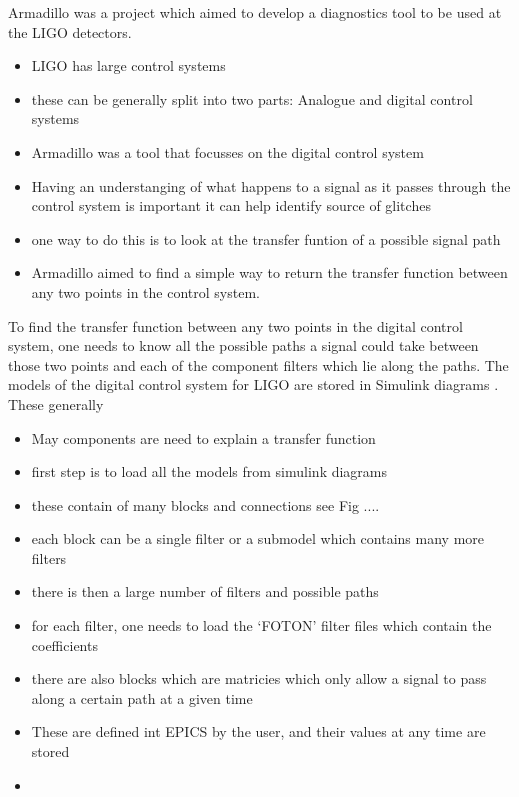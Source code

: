 Armadillo was a project which aimed to develop a diagnostics tool to be used at the \gls{LIGO} detectors.

\begin{itemize}
	\item LIGO has large control systems
	\item these can be generally split into two parts: Analogue and digital control systems
	\item Armadillo was a tool that focusses on the digital control system
	\item Having an understanging of what happens to a signal as it passes through the control system is important it can help identify source of glitches
	\item one way to do this is to look at the transfer funtion of a possible signal path 
	\item Armadillo aimed to find a simple way to return the transfer function between any two points in the control system.
\end{itemize}


To find the transfer function between any two points in the digital control system, one needs to know all the possible paths a signal could take between those two points and each of the component filters which lie along the paths.
The models of the digital control system for \gls{LIGO} are stored in Simulink diagrams \citep{}.
These generally 

\begin{itemize}
	\item May components are need to explain a transfer function
	\item first step is to load all the models from simulink diagrams
	\item these contain of many blocks and connections see Fig ....
	\item each block can be a single filter or a submodel which contains many more filters
	\item there is then a large number of filters and possible paths
	\item for each filter, one needs to load the `FOTON' filter files which contain the coefficients 
	\item there are also blocks which are matricies which only allow a signal to pass along a certain path at a given time
	\item These are defined int EPICS by the user, and their values at any time are stored
	\item 
\end{itemize}
